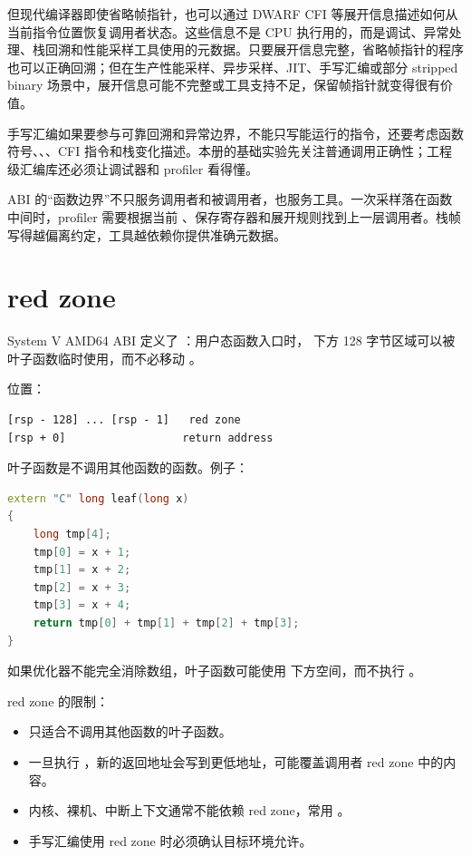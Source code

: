 但现代编译器即使省略帧指针，也可以通过 DWARF CFI 等展开信息描述如何从当前指令位置恢复调用者状态。这些信息不是 CPU 执行用的，而是调试、异常处理、栈回溯和性能采样工具使用的元数据。只要展开信息完整，省略帧指针的程序也可以正确回溯；但在生产性能采样、异步采样、JIT、手写汇编或部分 stripped binary 场景中，展开信息可能不完整或工具支持不足，保留帧指针就变得很有价值。

手写汇编如果要参与可靠回溯和异常边界，不能只写能运行的指令，还要考虑函数符号、、、CFI 指令和栈变化描述。本册的基础实验先关注普通调用正确性；工程级汇编库还必须让调试器和 profiler 看得懂。

\begin{deepdive}
ABI 的“函数边界”不只服务调用者和被调用者，也服务工具。一次采样落在函数中间时，profiler 需要根据当前 、保存寄存器和展开规则找到上一层调用者。栈帧写得越偏离约定，工具越依赖你提供准确元数据。
\end{deepdive}

\section{red zone}

System V AMD64 ABI 定义了 ：用户态函数入口时， 下方 128 字节区域可以被叶子函数临时使用，而不必移动 。

位置：

\begin{lstlisting}
[rsp - 128] ... [rsp - 1]   red zone
[rsp + 0]                  return address
\end{lstlisting}

叶子函数是不调用其他函数的函数。例子：

\begin{lstlisting}[language=C++]
extern "C" long leaf(long x)
{
    long tmp[4];
    tmp[0] = x + 1;
    tmp[1] = x + 2;
    tmp[2] = x + 3;
    tmp[3] = x + 4;
    return tmp[0] + tmp[1] + tmp[2] + tmp[3];
}
\end{lstlisting}

如果优化器不能完全消除数组，叶子函数可能使用  下方空间，而不执行 。

red zone 的限制：

\begin{itemize}
  \item 只适合不调用其他函数的叶子函数。
  \item 一旦执行 ，新的返回地址会写到更低地址，可能覆盖调用者 red zone 中的内容。
  \item 内核、裸机、中断上下文通常不能依赖 red zone，常用 。
  \item 手写汇编使用 red zone 时必须确认目标环境允许。
\end{itemize}

